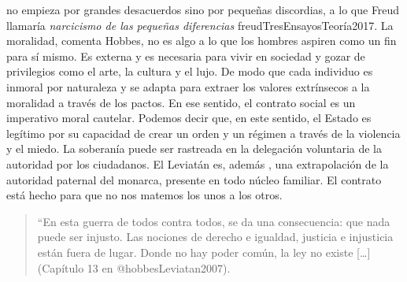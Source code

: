 \documentclass[
]{article}
\begin{document}
no empieza por grandes desacuerdos sino por pequeñas discordias, a lo
que Freud llamaría \emph{narcicismo de las pequeñas diferencias}
freudTresEnsayosTeoría2017. La moralidad, comenta Hobbes, no es algo a
lo que los hombres aspiren como un fin para sí mismo. Es externa y es
necesaria para vivir en sociedad y gozar de privilegios como el arte, la
cultura y el lujo. De modo que cada individuo es inmoral por naturaleza
y se adapta para extraer los valores extrínsecos a la moralidad a través
de los pactos. En ese sentido, el contrato social es un imperativo moral
cautelar. Podemos decir que, en este sentido, el Estado es legítimo por
su capacidad de crear un orden y un régimen a través de la violencia y
el miedo. La soberanía puede ser rastreada en la delegación voluntaria
de la autoridad por los ciudadanos. El Leviatán es, además , una
extrapolación de la autoridad paternal del monarca, presente en todo
núcleo familiar. El contrato está hecho para que no nos matemos los unos
a los otros.

\begin{quote}
``En esta guerra de todos contra todos, se da una consecuencia: que nada
puede ser injusto. Las nociones de derecho e igualdad, justicia e
injusticia están fuera de lugar. Donde no hay poder común, la ley no
existe {[}\ldots{]} (Capítulo 13 en @hobbesLeviatan2007).
\end{quote}
\end{document}
